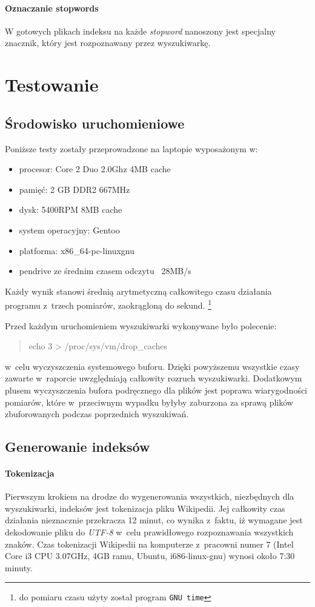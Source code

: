 \documentclass[a4paper,12pt]{article}
\begin{document}
\paragraph{Oznaczanie stopwords} W gotowych plikach indeksu na każde
\textit{stopword} nanoszony jest specjalny znacznik, który jest rozpoznawany
przez wyszukiwarkę.

\section{Testowanie}

\subsection{Środowisko uruchomieniowe}

Poniższe testy zostały przeprowadzone na laptopie wyposażonym w:
\begin{itemize}
	\item procesor: Core 2 Duo 2.0Ghz 4MB cache
	\item pamięć: 2 GB DDR2 667MHz
	\item dysk: 5400RPM 8MB cache
	\item system operacyjny: Gentoo
	\item platforma: x86\_64-pc-linux\dywiz gnu
	\item pendrive ze średnim czasem odczytu ~28MB/s
\end{itemize}
Każdy wynik stanowi średnią arytmetyczną całkowitego czasu działania programu
z~trzech pomiarów, zaokrągloną do sekund.
\footnote{do pomiaru czasu użyty został program \texttt{GNU time}}

Przed każdym uruchomieniem wyszukiwarki wykonywane było polecenie:
\begin{quote}
	echo 3 \textgreater{} /proc/sys/vm/drop\_caches
\end{quote}
w~celu wyczyszczenia systemowego buforu. Dzięki powyższemu wszystkie czasy zawarte
w~raporcie uwzględniają całkowity rozruch wyszukiwarki. Dodatkowym plusem
wyczyszczenia bufora podręcznego dla plików jest poprawa wiarygodności
pomiarów, które w~przeciwnym wypadku byłyby zaburzona za sprawą plików
zbuforowanych podczas poprzednich wyszukiwań.

\subsection{Generowanie indeksów}

\paragraph{Tokenizacja}
Pierwszym krokiem na drodze do wygenerowania wszystkich, niezbędnych dla
wyszukiwarki, indeksów jest tokenizacja pliku Wikipedii. Jej całkowity czas
działania nieznacznie przekracza 12 minut, co wynika z~faktu, iż wymagane jest
dekodowanie pliku do \textit{UTF-8} w~celu prawidłowego rozpoznawania
wszystkich znaków. Czas tokenizacji Wikipedii na komputerze z~pracowni numer 7
(Intel Core i3 CPU 3.07GHz, 4GB ramu, Ubuntu, i686-linux-gnu) wynosi około 7:30
minuty.
\end{document}
